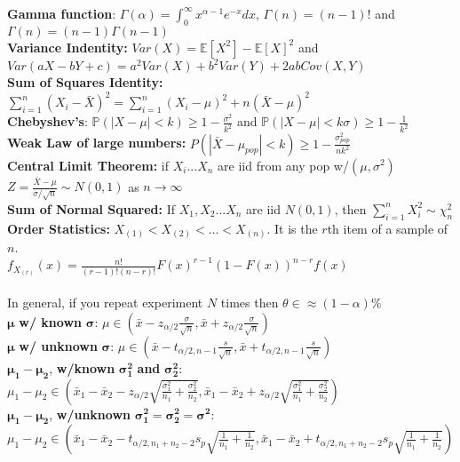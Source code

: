 \documentclass[answers,12pt,addpoints]{exam}
\begin{document}
\textbf{Gamma function}: $\Gamma(\alpha) = \int_0^\infty x^{\alpha-1}e^{-x}dx$, $\Gamma(n) = (n-1)!$ and $\Gamma(n) = (n-1)\Gamma(n-1)$\\
\textbf{Variance Indentity:} $Var(X) = \mathbb{E}[X^2] - \mathbb{E}[X]^2$ and $Var(aX-bY+c) = a^2Var(X) + b^2Var(Y) + 2abCov(X,Y)$\\
\textbf{Sum of Squares Identity:} $\sum_{i=1}^n (X_i - \bar{X})^2 = \sum_{i=1}^n (X_i - \mu)^2 + n(\bar{X} - \mu)^2$\\
\textbf{Chebyshev's}: $\mathbb{P}(|X-\mu|< k) \geq 1 - \frac{\sigma^2}{k^2}$ and $\mathbb{P}(|X-\mu|< k\sigma) \geq 1 - \frac{1}{k^2}$\\
\textbf{Weak Law of large numbers:} $P(|\bar{X} - \mu_{pop}| < k ) \geq 1 -\frac{\sigma^2_{pop}}{nk^2} $\\
\textbf{Central Limit Theorem:} if $X_i ... X_n$ are iid from any pop w/$(\mu, \sigma^2)$ $Z = \frac{\bar{X} - \mu}{\sigma/\sqrt{n}} \sim N(0,1)$ as $n \to \infty$\\
\textbf{Sum of Normal Squared:} If $X_1, X_2 ... X_n$ are iid $N(0,1)$, then $\sum_{i=1}^n X_i^2 \sim \chi^2_n$\\
\textbf{Order Statistics:} $X_{(1)} < X_{(2)} < ... < X_{(n)}$. It is the $r$th item of a sample of $n$. \\
$f_{X_{(r)}}(x) = \frac{n!}{(r-1)!(n-r)!}F(x)^{r-1}(1-F(x))^{n-r}f(x)$\\\\
In general, if you repeat experiment $N$ times then $\theta \in \approx (1-\alpha)\%$\\
$\boldsymbol{\mu}$ \textbf{w/ known} $\boldsymbol{\sigma}$: $\mu \in \left(\bar{x} - z_{\alpha/2}\frac{\sigma}{\sqrt{n}}, \bar{x} + z_{\alpha/2}\frac{\sigma}{\sqrt{n}}\right)$\\ 
$\boldsymbol{\mu}$ \textbf{w/ unknown} $\boldsymbol{\sigma}$: $\mu \in \left(\bar{x} - t_{\alpha/2, n-1}\frac{s}{\sqrt{n}}, \bar{x} + t_{\alpha/2, n-1}\frac{s}{\sqrt{n}}\right)$\\
$\boldsymbol{\mu_1 - \mu_2}$, \textbf{w/known} $\boldsymbol{\sigma_1^2}$ \textbf{and} $\boldsymbol{\sigma_2^2}$: $\mu_1 - \mu_2 \in \left(\bar{x}_1 - \bar{x}_2 - z_{\alpha/2}\sqrt{\frac{\sigma_1^2}{n_1} + \frac{\sigma_2^2}{n_2}}, \bar{x}_1 - \bar{x}_2 + z_{\alpha/2}\sqrt{\frac{\sigma_1^2}{n_1} + \frac{\sigma_2^2}{n_2}}\right)$\\
$\boldsymbol{\mu_1 - \mu_2}$, \textbf{w/unknown} $\boldsymbol{\sigma_1^2 = \sigma_2^2 = \sigma^2}$:\\
$\mu_1 - \mu_2 \in \left(\bar{x}_1 - \bar{x}_2 - t_{\alpha/2, n_1+n_2-2}s_p\sqrt{\frac{1}{n_1} + \frac{1}{n_2}}, \bar{x}_1 - \bar{x}_2 + t_{\alpha/2, n_1+n_2-2}s_p\sqrt{\frac{1}{n_1} + \frac{1}{n_2}}\right)$\\ 
\end{document}
